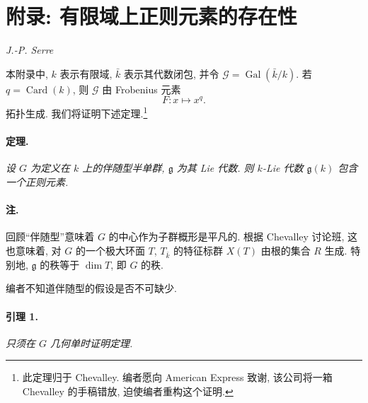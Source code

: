 

\section{附录: 有限域上正则元素的存在性}

\begin{center}
\itshape J.-P. Serre
\end{center}

本附录中, \(k\) 表示有限域, \(\bar k\) 表示其代数闭包, 并令 \(\mathcal G=\operatorname{Gal}(\bar k/k)\). 若 \(q=\operatorname{Card}(k)\), 则 \(\mathcal G\) 由 Frobenius 元素
\[
  F\colon x\longmapsto x^q.
\]
拓扑生成. 我们将证明下述定理.\footnote{此定理归于 Chevalley. 编者愿向 American Express 致谢, 该公司将一箱 Chevalley 的手稿错放, 迫使编者重构这个证明.}

\paragraph{\textbf{定理.}}
{\itshape 设 \(G\) 为定义在 \(k\) 上的伴随型半单群, \(\mathfrak g\) 为其 Lie 代数. 则 \(k\)-Lie 代数 \(\mathfrak g(k)\) 包含一个正则元素.}

\paragraph{\textbf{注.}}
\textup{} 回顾“伴随型”意味着 \(G\) 的中心作为子群概形是平凡的. 根据 Chevalley 讨论班, 这也意味着, 对 \(G\) 的一个极大环面 \(T\), \(T_{\bar k}\) 的特征标群 \(X(T)\) 由根的集合 \(R\) 生成. 特别地, \(\mathfrak g\) 的秩等于 \(\dim T\), 即 \(G\) 的秩.

\textup{} 编者不知道伴随型的假设是否不可缺少.

\paragraph{\textbf{引理 1.}}
{\itshape 只须在 \(G\) 几何单时证明定理.}

